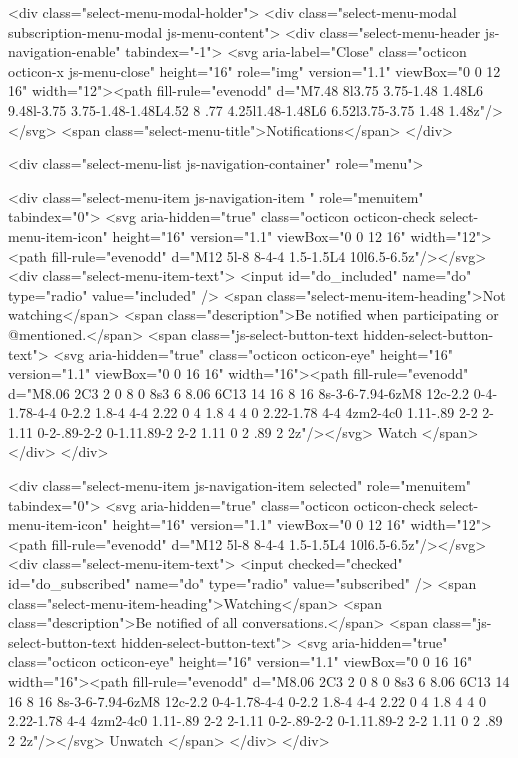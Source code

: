         <div class="select-menu-modal-holder">
          <div class="select-menu-modal subscription-menu-modal js-menu-content">
            <div class="select-menu-header js-navigation-enable" tabindex="-1">
              <svg aria-label="Close" class="octicon octicon-x js-menu-close" height="16" role="img" version="1.1" viewBox="0 0 12 16" width="12"><path fill-rule="evenodd" d="M7.48 8l3.75 3.75-1.48 1.48L6 9.48l-3.75 3.75-1.48-1.48L4.52 8 .77 4.25l1.48-1.48L6 6.52l3.75-3.75 1.48 1.48z"/></svg>
              <span class="select-menu-title">Notifications</span>
            </div>

              <div class="select-menu-list js-navigation-container" role="menu">

                <div class="select-menu-item js-navigation-item " role="menuitem" tabindex="0">
                  <svg aria-hidden="true" class="octicon octicon-check select-menu-item-icon" height="16" version="1.1" viewBox="0 0 12 16" width="12"><path fill-rule="evenodd" d="M12 5l-8 8-4-4 1.5-1.5L4 10l6.5-6.5z"/></svg>
                  <div class="select-menu-item-text">
                    <input id="do_included" name="do" type="radio" value="included" />
                    <span class="select-menu-item-heading">Not watching</span>
                    <span class="description">Be notified when participating or @mentioned.</span>
                    <span class="js-select-button-text hidden-select-button-text">
                      <svg aria-hidden="true" class="octicon octicon-eye" height="16" version="1.1" viewBox="0 0 16 16" width="16"><path fill-rule="evenodd" d="M8.06 2C3 2 0 8 0 8s3 6 8.06 6C13 14 16 8 16 8s-3-6-7.94-6zM8 12c-2.2 0-4-1.78-4-4 0-2.2 1.8-4 4-4 2.22 0 4 1.8 4 4 0 2.22-1.78 4-4 4zm2-4c0 1.11-.89 2-2 2-1.11 0-2-.89-2-2 0-1.11.89-2 2-2 1.11 0 2 .89 2 2z"/></svg>
                      Watch
                    </span>
                  </div>
                </div>

                <div class="select-menu-item js-navigation-item selected" role="menuitem" tabindex="0">
                  <svg aria-hidden="true" class="octicon octicon-check select-menu-item-icon" height="16" version="1.1" viewBox="0 0 12 16" width="12"><path fill-rule="evenodd" d="M12 5l-8 8-4-4 1.5-1.5L4 10l6.5-6.5z"/></svg>
                  <div class="select-menu-item-text">
                    <input checked="checked" id="do_subscribed" name="do" type="radio" value="subscribed" />
                    <span class="select-menu-item-heading">Watching</span>
                    <span class="description">Be notified of all conversations.</span>
                    <span class="js-select-button-text hidden-select-button-text">
                      <svg aria-hidden="true" class="octicon octicon-eye" height="16" version="1.1" viewBox="0 0 16 16" width="16"><path fill-rule="evenodd" d="M8.06 2C3 2 0 8 0 8s3 6 8.06 6C13 14 16 8 16 8s-3-6-7.94-6zM8 12c-2.2 0-4-1.78-4-4 0-2.2 1.8-4 4-4 2.22 0 4 1.8 4 4 0 2.22-1.78 4-4 4zm2-4c0 1.11-.89 2-2 2-1.11 0-2-.89-2-2 0-1.11.89-2 2-2 1.11 0 2 .89 2 2z"/></svg>
                        Unwatch
                    </span>
                  </div>
                </div>

